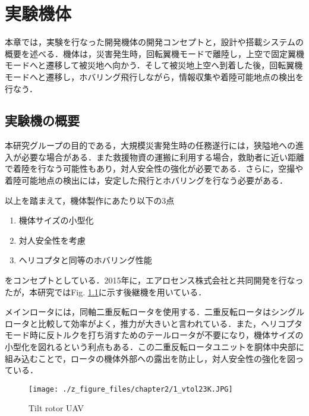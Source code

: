 
\chapter{実験機体}
\label{aircraft}

本章では，実験を行なった開発機体の開発コンセプトと，設計や搭載システムの概要を述べる．機体は，災害発生時，回転翼機モードで離陸し，上空で固定翼機モードへと遷移して被災地へ向かう．そして被災地上空へ到着した後，回転翼機モードへと遷移し，ホバリング飛行しながら，情報収集や着陸可能地点の検出を行なう．

\section{実験機の概要}
本研究グループの目的である，大規模災害発生時の任務遂行には，狭隘地への進入が必要な場合がある．また救援物資の運搬に利用する場合，救助者に近い距離で着陸を行なう可能性もあり，対人安全性の強化が必要である．さらに，空撮や着陸可能地点の検出には，安定した飛行とホバリングを行なう必要がある．

以上を踏まえて，機体製作にあたり以下の3点
	\begin{enumerate}
	\item 機体サイズの小型化
	\item 対人安全性を考慮
	\item ヘリコプタと同等のホバリング性能
	\end{enumerate}
をコンセプトとしている．2015年に，エアロセンス株式会社と共同開発を行なったが，本研究ではFig. \ref{fig:vtol23k}に示す後継機を用いている．

\hspace{5pt}

メインロータには，同軸二重反転ロータを使用する．二重反転ロータはシングルロータと比較して効率がよく，推力が大きいと言われている．また，ヘリコプタモード時に反トルクを打ち消すためのテールロータが不要になり，機体サイズの小型化を図れるという利点もある．この二重反転ロータユニットを胴体中央部に組み込むことで，ロータの機体外部への露出を防止し，対人安全性の強化を図っている．

\begin{figure}[H]
	\centering
	\texttt{[image: ./z\_figure\_files/chapter2/1\_vtol23K.JPG]}
	\caption{Tilt rotor UAV}
	\label{fig:vtol23k}
\end{figure}

